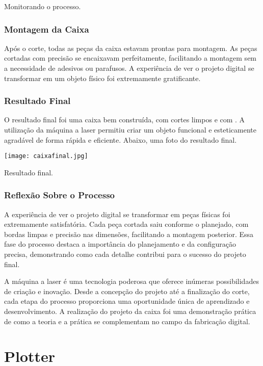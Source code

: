\documentclass[
]{book}
\begin{document}
Monitorando o processo.

\subsection{Montagem da Caixa}\label{montagem-da-caixa}

Após o corte, todas as peças da caixa estavam prontas para montagem. As peças cortadas com precisão se encaixavam perfeitamente, facilitando a montagem sem a necessidade de adesivos ou parafusos. A experiência de ver o projeto digital se transformar em um objeto físico foi extremamente gratificante.

\subsection{Resultado Final}\label{resultado-final-1}

O resultado final foi uma caixa bem construída, com cortes limpos e com . A utilização da máquina a laser permitiu criar um objeto funcional e esteticamente agradável de forma rápida e eficiente. Abaixo, uma foto do resultado final.

\texttt{[image: caixafinal.jpg]}

Resultado final.

\subsection{Reflexão Sobre o Processo}\label{reflexuxe3o-sobre-o-processo-1}

A experiência de ver o projeto digital se transformar em peças físicas foi extremamente satisfatória. Cada peça cortada saiu conforme o planejado, com bordas limpas e precisão nas dimensões, facilitando a montagem posterior. Essa fase do processo destaca a importância do planejamento e da configuração precisa, demonstrando como cada detalhe contribui para o sucesso do projeto final.

A máquina a laser é uma tecnologia poderosa que oferece inúmeras possibilidades de criação e inovação. Desde a concepção do projeto até a finalização do corte, cada etapa do processo proporciona uma oportunidade única de aprendizado e desenvolvimento. A realização do projeto da caixa foi uma demonstração prática de como a teoria e a prática se complementam no campo da fabricação digital.

\chapter{Plotter}\label{plotter}
\end{document}
